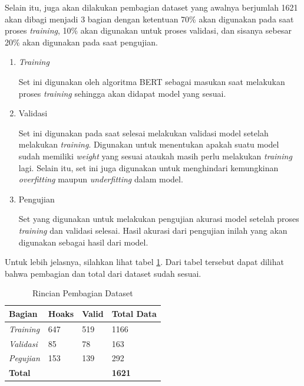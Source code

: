 Selain itu, juga akan dilakukan pembagian dataset yang awalnya berjumlah 1621 akan dibagi menjadi 3 bagian dengan ketentuan 70\% akan digunakan pada saat proses \textit{training}, 10\% akan digunakan untuk proses validasi, dan sisanya sebesar 20\% akan digunakan pada saat pengujian.

\begin{enumerate}
  \item \textit{Training}

        Set ini digunakan oleh algoritma BERT sebagai masukan saat melakukan proses \textit{training} sehingga akan didapat model yang sesuai.

  \item Validasi

        Set ini digunakan pada saat selesai melakukan validasi model setelah melakukan \textit{training}. Digunakan untuk menentukan apakah suatu model sudah memiliki \textit{weight} yang sesuai ataukah masih perlu melakukan \textit{training} lagi. Selain itu, set ini juga digunakan untuk menghindari kemungkinan \textit{overfitting} maupun \textit{underfitting} dalam model.

  \item Pengujian

        Set yang digunakan untuk melakukan pengujian akurasi model setelah proses \textit{training} dan validasi selesai. Hasil akurasi dari pengujian inilah yang akan digunakan sebagai hasil dari model.

\end{enumerate}

Untuk lebih jelasnya, silahkan lihat tabel \ref{tab:dataset_section}. Dari tabel tersebut dapat dilihat bahwa pembagian dan total dari dataset sudah sesuai.

\begin{table}
  \caption{Rincian Pembagian Dataset}
  \label{tab:dataset_section}
  \centering
  \begin{tabular}{ | l | l | l | l | }
    \hline
    \textbf{Bagian}                      & \textbf{Hoaks} & \textbf{Valid} & \textbf{Total Data} \\ \hline
    \textit{Training}                    & 647            & 519            & 1166                \\ \hline
    \textit{Validasi}                    & 85             & 78             & 163                 \\ \hline
    \textit{Pegujian}                    & 153            & 139            & 292                 \\ \hline
    \multicolumn{3}{|l|}{\textbf{Total}} & \textbf{1621}                                         \\ \hline
  \end{tabular}
\end{table}

